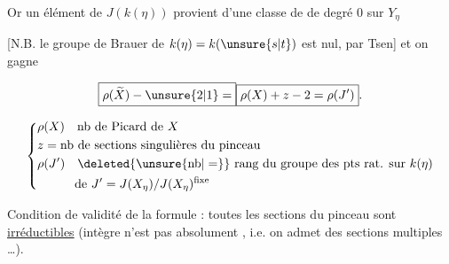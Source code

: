 Or un élément de
$J(k(\eta))$  provient  d’une classe de
 de degré $0$ sur $Y_\eta$

[N.B. le groupe de Brauer de $k(\eta)=k(\unsure{s|t})$
est nul, par Tsen] et on gagne

\[
 \boxed{\rho(\widetilde X)-\unsure{2|1}=}\boxed{\rho(X)+z-2=\rho(J')}.
\]

\[
\left\{\begin{aligned}
&\rho(X)\quad\text{nb de Picard de }X\\
&z=\text{nb de sections singulières du pinceau}\\
&\rho(J')\quad\deleted{\unsure{\mathrm{nb}|=}}\ \text{rang du groupe des pts rat. sur }k(\eta)\\
&\hspace{3em}\text{de }J'=J(X_\eta)/J(X_\eta)^{\rm fixe}
\end{aligned}\right.
\]

Condition de validité de la formule :
toutes les sections du pinceau sont 
\uline{irréductibles} (intègre n’est pas absolument ,
i.e. on admet des sections multiples \ldots).
